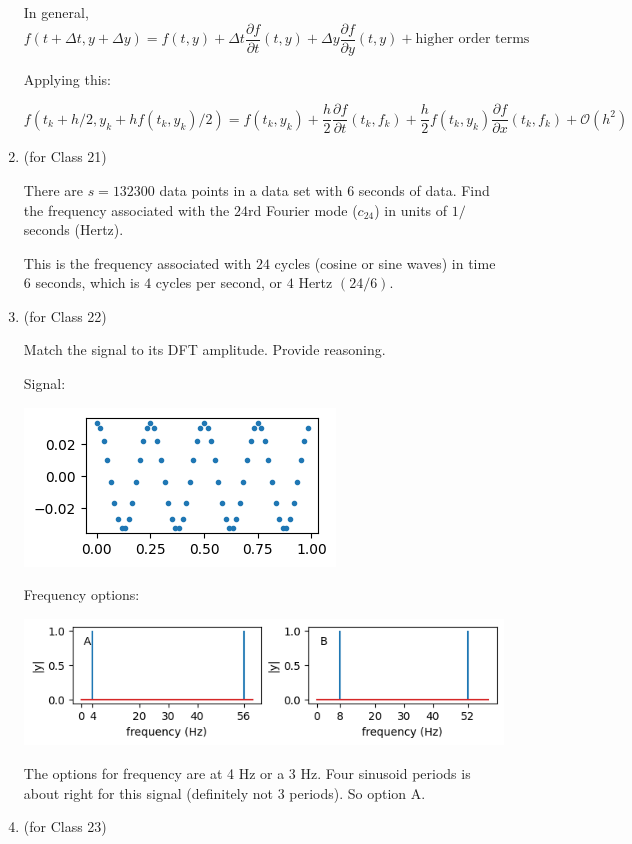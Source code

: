 \documentclass[12pt,letterpaper,answers]{exam}
\begin{document}
\begin{enumerate}
\begin{solution}
In general, $f(t+\Delta t, y+\Delta y) = f(t,y) + \Delta t \dfrac{\partial f}{\partial t}(t,y) +  \Delta y \dfrac{\partial f}{\partial y}(t,y) + \text{higher order terms}$


Applying this:

$f(t_k+h/2,y_k+hf(t_k,y_k)/2) = f(t_k,y_k) + \dfrac{h}{2}\dfrac{\partial f}{\partial t}(t_k,f_k) + \dfrac{h}{2}f(t_k,y_k) \dfrac{\partial f}{\partial x}(t_k,f_k) + \mathcal{O}(h^2)$

\end{solution}


\item (for Class 21)

There are $s = 132300$ data points in a data set with $6$ seconds of data.  Find the frequency associated with the $24$rd Fourier mode ($c_{24}$) in units of $1/$seconds (Hertz).

\begin{solution}
This is the frequency associated with $24$ cycles (cosine or sine waves) in time $6$ seconds, which is $4$ cycles per second, or $4$ Hertz $(24/6)$.
\end{solution}


\item (for Class 22)

Match the signal to its DFT amplitude.  Provide reasoning.

Signal:

\includegraphics[width=0.3\linewidth]{img/C21skill-2.png}

Frequency options:

\includegraphics[width=0.7\linewidth]{img/C21skill2-2.png}

\begin{solution}
The options for frequency are at 4 Hz or a 3 Hz.  Four sinusoid periods is about right for this signal (definitely not 3 periods).  So option A.
\end{solution}


\item (for Class 23)


\end{enumerate}
\end{document}
